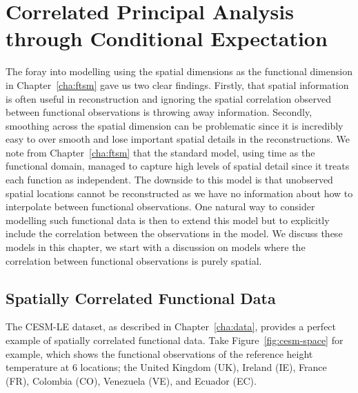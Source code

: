 
\chapter{Correlated Principal Analysis through Conditional Expectation \label{cha:cpace}}  %

\ifpdf
    \graphicspath{{Chapter5/Figs/Raster/}{Chapter5/Figs/PDF/}{Chapter5/Figs/}}
\else
    \graphicspath{{Chapter5/Figs/Vector/}{Chapter5/Figs/}}
\fi

The foray into modelling using the spatial dimensions as the functional dimension in Chapter~\ref{cha:ftsm} gave us two clear findings.
Firstly, that spatial information is often useful in reconstruction and ignoring the spatial correlation observed between functional observations is throwing away information.
Secondly, smoothing across the spatial dimension can be problematic since it is incredibly easy to over smooth and lose important spatial details in the reconstructions. 
We note from Chapter~\ref{cha:ftsm} that the standard model, using time as the functional domain, managed to capture high levels of spatial detail since it treats each function as independent.
The downside to this model is that unobserved spatial locations cannot be reconstructed as we have no information about how to interpolate between functional observations.
One natural way to consider modelling such functional data is then to extend this model but to explicitly include the correlation between the observations in the model. 
We discuss these models in this chapter, we start with a discussion on models where the correlation between functional observations is purely spatial.

\section{Spatially Correlated Functional Data \label{sec:space}}
The CESM-LE dataset, as described in Chapter~\ref{cha:data}, provides a perfect example of spatially correlated functional data.
Take Figure~\ref{fig:cesm-space} for example, which shows the functional observations of the reference height temperature at 6 locations; the United Kingdom (UK), Ireland (IE), France (FR), Colombia (CO), Venezuela (VE), and Ecuador (EC). 

